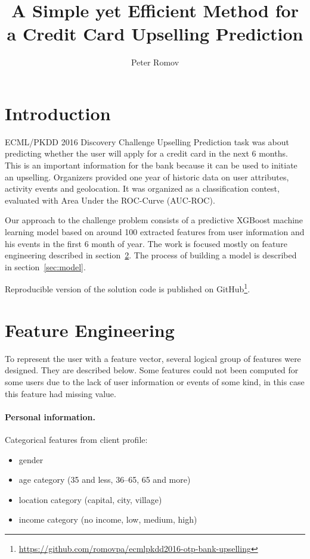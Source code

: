 \documentclass{llncs}
\title{A Simple yet Efficient Method for a Credit Card Upselling Prediction}
\author{Peter Romov}
\institute{Yandex Data Factory}
\begin{document}
	
\maketitle
	
\section{Introduction}

ECML/PKDD 2016 Discovery Challenge Upselling Prediction task was about predicting whether the user will apply for a credit card in the next 6 months. This is an important information for the bank because it can be used to initiate an upselling. Organizers provided one year of historic data on user attributes, activity events and geolocation. It was organized as a classification contest, evaluated with Area Under the ROC-Curve (AUC-ROC).

Our approach to the challenge problem consists of a predictive XGBoost machine learning model based on around 100 extracted features from user information and his events in the first 6 month of year. The work is focused mostly on feature engineering described in section~\ref{sec:feature}. The process of building a model is described in section~\ref{sec:model}.

Reproducible version of the solution code is published on GitHub\footnote{\url{https://github.com/romovpa/ecmlpkdd2016-otp-bank-upselling}}.
	
\section{Feature Engineering}
\label{sec:feature}

To represent the user with a feature vector, several logical group of features were designed. They are described below. Some features could not been computed for some users due to the lack of user information or events of some kind, in this case this feature had missing value.

\paragraph{Personal information.}

Categorical features from client profile:
\begin{itemize}
	\item gender
	\item age category (35 and less, 36--65, 65 and more)
	\item location category (capital, city, village)
	\item income category (no income, low, medium, high)
\end{itemize}
	
\end{document}
